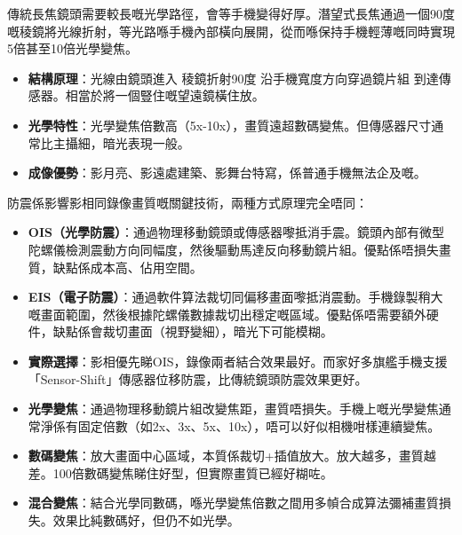 傳統長焦鏡頭需要較長嘅光學路徑，會等手機變得好厚。潛望式長焦通過一個90度嘅稜鏡將光線折射，等光路喺手機內部橫向展開，從而喺保持手機輕薄嘅同時實現5倍甚至10倍光學變焦。

\begin{itemize}
  \item \textbf{結構原理}：光線由鏡頭進入 稜鏡折射90度 沿手機寬度方向穿過鏡片組 到達傳感器。相當於將一個豎住嘅望遠鏡橫住放。
  \item \textbf{光學特性}：光學變焦倍數高（5x-10x），畫質遠超數碼變焦。但傳感器尺寸通常比主攝細，暗光表現一般。
  \item \textbf{成像優勢}：影月亮、影遠處建築、影舞台特寫，係普通手機無法企及嘅。
\end{itemize}


防震係影響影相同錄像畫質嘅關鍵技術，兩種方式原理完全唔同：

\begin{itemize}
  \item \textbf{OIS（光學防震）}：通過物理移動鏡頭或傳感器嚟抵消手震。鏡頭內部有微型陀螺儀檢測震動方向同幅度，然後驅動馬達反向移動鏡片組。優點係唔損失畫質，缺點係成本高、佔用空間。
  \item \textbf{EIS（電子防震）}：通過軟件算法裁切同偏移畫面嚟抵消震動。手機錄製稍大嘅畫面範圍，然後根據陀螺儀數據裁切出穩定嘅區域。優點係唔需要額外硬件，缺點係會裁切畫面（視野變細），暗光下可能模糊。
  \item \textbf{實際選擇}：影相優先睇OIS，錄像兩者結合效果最好。而家好多旗艦手機支援「Sensor-Shift」傳感器位移防震，比傳統鏡頭防震效果更好。
\end{itemize}


\begin{itemize}
  \item \textbf{光學變焦}：通過物理移動鏡片組改變焦距，畫質唔損失。手機上嘅光學變焦通常淨係有固定倍數（如2x、3x、5x、10x），唔可以好似相機咁樣連續變焦。
  \item \textbf{數碼變焦}：放大畫面中心區域，本質係裁切+插值放大。放大越多，畫質越差。100倍數碼變焦睇住好型，但實際畫質已經好糊咗。
  \item \textbf{混合變焦}：結合光學同數碼，喺光學變焦倍數之間用多幀合成算法彌補畫質損失。效果比純數碼好，但仍不如光學。
\end{itemize}


